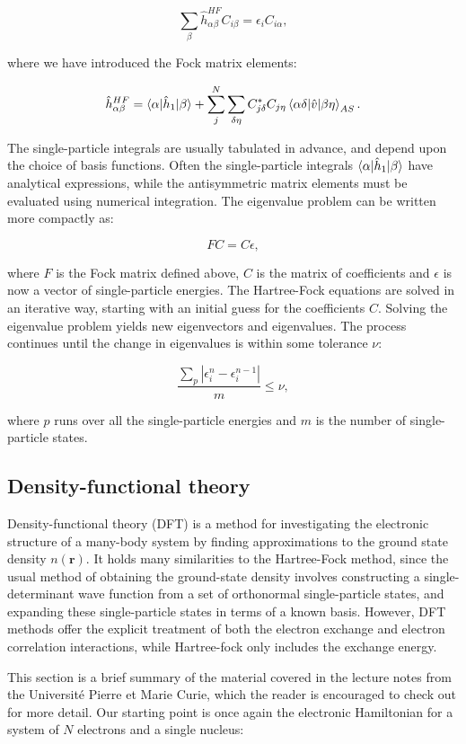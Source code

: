 \begin{equation}
\sum_{\beta} \hat{h}_{\alpha\beta}^{HF} C_{i\beta}
= \epsilon_i C_{i\alpha} ,
\end{equation}

where we have introduced the Fock matrix elements:

\begin{equation}
\hat{h}_{\alpha\beta}^{HF} = 
\braket{\alpha | \hat{h}_1 | \beta}
+ \sum_{j}^N \sum_{\delta\eta} C_{j\delta}^* C_{j\eta}
\braket{\alpha\delta | \hat{v} | \beta\eta}_{AS} .
\end{equation}

The single-particle integrals are usually tabulated
in advance, and depend upon the choice of basis functions.
Often the single-particle integrals $\braket{\alpha | \hat{h}_1 | \beta}$
have analytical expressions, while the antisymmetric matrix elements
must be evaluated using numerical integration.
The eigenvalue problem can be written more compactly as:

\begin{equation}
FC = C\epsilon ,
\end{equation}

where $F$ is the Fock matrix defined above, $C$ is the matrix
of coefficients and $\epsilon$ is now
a vector of single-particle energies.
The Hartree-Fock equations are solved in an iterative way,
starting with an initial guess for the coefficients $C$.
Solving the eigenvalue problem yields new eigenvectors
and eigenvalues.
The process continues until the change in eigenvalues
is within some tolerance $\nu$:

\begin{equation}
\frac{\sum_p \left| \epsilon_i^n - \epsilon_i^{n-1} \right|}
{m} \leq \nu ,
\end{equation}

where $p$ runs over all the single-particle energies and
$m$ is the number of single-particle states.

\subsection{Density-functional theory}
Density-functional theory (DFT) is a method for
investigating the electronic structure of a many-body system
by finding approximations to the ground state
density $n(\bm{r})$.
It holds many similarities to the Hartree-Fock method,
since the usual method of obtaining the ground-state density
involves constructing a single-determinant wave function
from a set of orthonormal single-particle states,
and expanding these single-particle states in terms
of a known basis. 
However, DFT methods offer the explicit treatment of both the
electron exchange and electron correlation interactions,
while Hartree-fock only includes
the exchange energy.
\par
This section is a brief summary of the material covered
in the \parencite[Toulouse][pages 1-12]{toulouse2017}
lecture notes from the Université Pierre et Marie Curie,
which the reader is encouraged to check out for more detail.
Our starting point is once again the electronic Hamiltonian
for a system of $N$ electrons and a single nucleus:

